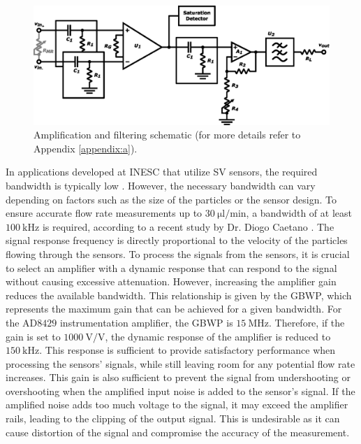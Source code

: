 \begin{figure}[!ht]
    \centering
    \includegraphics[width=.65\textwidth]{images/chapter_4/channel/amp.eps}
    \caption{Amplification and filtering schematic (for more details refer to Appendix \ref{appendix:a}).}
    \label{figure:amp-schematic}
\end{figure}

In applications developed at \ac{INESC} that utilize \ac{SV} sensors, the required bandwidth is typically low \cite{1.3562915, s90604119}. However, the necessary bandwidth can vary depending on factors such as the size of the particles or the sensor design. To ensure accurate flow rate measurements up to $\mathrm{30~\mu l/min}$, a bandwidth of at least $\mathrm{100~kHz}$ is required, according to a recent study by Dr. Diogo Caetano \cite{DiogoC_thesis}. The signal response frequency is directly proportional to the velocity of the particles flowing through the sensors. To process the signals from the sensors, it is crucial to select an amplifier with a dynamic response that can respond to the signal without causing excessive attenuation. However, increasing the amplifier gain reduces the available bandwidth. This relationship is given by the \ac{GBWP}, which represents the maximum gain that can be achieved for a given bandwidth. For the $\mathrm{AD8429}$ instrumentation amplifier, the \ac{GBWP} is $\mathrm{15~MHz}$. Therefore, if the gain is set to $\mathrm{1000~V/V}$, the dynamic response of the amplifier is reduced to $\mathrm{150~kHz}$. This response is sufficient to provide satisfactory performance when processing the sensors' signals, while still leaving room for any potential flow rate increases. This gain is also sufficient to prevent the signal from undershooting or overshooting when the amplified input noise is added to the sensor's signal. If the amplified noise adds too much voltage to the signal, it may exceed the amplifier rails, leading to the clipping of the output signal. This is undesirable as it can cause distortion of the signal and compromise the accuracy of the measurement.

